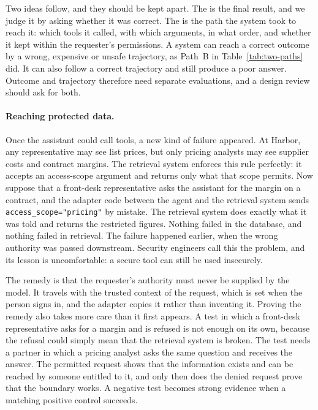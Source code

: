 Two ideas follow, and they should be kept apart. The  is the final result, and we judge it by asking whether it was correct. The  is the path the system took to reach it: which tools it called, with which arguments, in what order, and whether it kept within the requester's permissions. A system can reach a correct outcome by a wrong, expensive or unsafe trajectory, as Path~B in Table~\ref{tab:two-paths} did. It can also follow a correct trajectory and still produce a poor answer. Outcome and trajectory therefore need separate evaluations, and a design review should ask for both.

\paragraph{Reaching protected data.} Once the assistant could call tools, a new kind of failure appeared. At Harbor, any representative may see list prices, but only pricing analysts may see supplier costs and contract margins. The retrieval system enforces this rule perfectly: it accepts an access-scope argument and returns only what that scope permits. Now suppose that a front-desk representative asks the assistant for the margin on a contract, and the adapter code between the agent and the retrieval system sends \texttt{access\_scope="pricing"} by mistake. The retrieval system does exactly what it was told and returns the restricted figures. Nothing failed in the database, and nothing failed in retrieval. The failure happened earlier, when the wrong authority was passed downstream. Security engineers call this the  problem, and its lesson is uncomfortable: a secure tool can still be used insecurely.

The remedy is that the requester's authority must never be supplied by the model. It travels with the trusted context of the request, which is set when the person signs in, and the adapter copies it rather than inventing it. Proving the remedy also takes more care than it first appears. A test in which a front-desk representative asks for a margin and is refused is not enough on its own, because the refusal could simply mean that the retrieval system is broken. The test needs a partner in which a pricing analyst asks the same question and receives the answer. The permitted request shows that the information exists and can be reached by someone entitled to it, and only then does the denied request prove that the boundary works. A negative test becomes strong evidence when a matching positive control succeeds.

